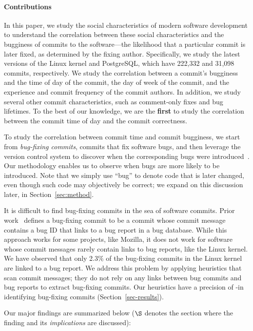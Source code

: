 \paragraph{Contributions}

In this paper, we study the social characteristics of modern software
development to understand the correlation between these social characteristics
and the bugginess of commits to the software---the likelihood that a
particular commit is later fixed, as determined by the fixing author.
Specifically, we study the latest versions of the Linux kernel and PostgreSQL,
which have 222,332 and 31,098 commits, respectively. We study the correlation
between a commit's bugginess and the time of day of the commit, the day of week
of the commit, and the experience and commit frequency of the commit authors.
In addition, we study several other commit characteristics, such as comment-only
fixes and bug lifetimes.  To the best of our knowledge, we are the {\bf first}
to study the correlation between the commit time of day and the commit
correctness.

To study the correlation between commit time and commit bugginess, we start from
{\em bug-fixing commits}, commits that fix software bugs, and then leverage the
version control system to discover when the corresponding bugs were
introduced~\cite{sliwerski-msr-2005}.  Our methodology enables us to observe
when bugs are more likely to be introduced.  Note that we simply use ``bug'' to
denote code that is later changed, even though such code may objectively be
correct; we expand on this discussion later, in Section~\ref{sec:method}.

It is difficult to find bug-fixing commits in the sea of software commits.
Prior work~\cite{sliwerski-msr-2005} defines a bug-fixing commit to be a commit
whose commit message contains a bug ID that links to a bug report in a bug
database. While this approach works for some projects, like Mozilla, it does not
work for software whose commit messages rarely contain links to bug reports,
like the Linux kernel.  We have observed that only 2.3\% of the bug-fixing
commits in the Linux kernel are linked to a bug report. We address this problem
by applying heuristics that scan commit messages; they do not rely on any links
between bug commits and bug reports to extract bug-fixing commits.  Our
heuristics have a precision of \postP-\linuxP in identifying bug-fixing commits
(Section~\ref{sec-results}).

Our major findings are summarized below ($\S$ denotes the section where the
finding and its {\em implications} are discussed):

